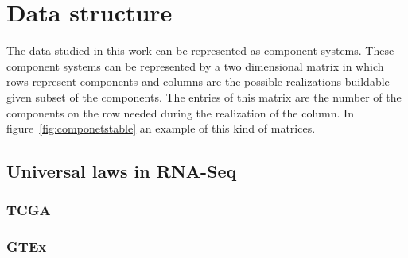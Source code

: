 \chapter{Data structure}\label{ch:structure}

The data studied in this work can be represented as component systems. These component systems can be represented by a two dimensional matrix in which rows represent components and columns are the possible realizations buildable given subset of the components. The entries of this matrix are the number of the components on the row needed during the realization of the column. In figure~\ref{fig:componetstable} an example of this kind of matrices.



\section{Universal laws in RNA-Seq}
\subsection{TCGA}

\subsection{GTEx}




